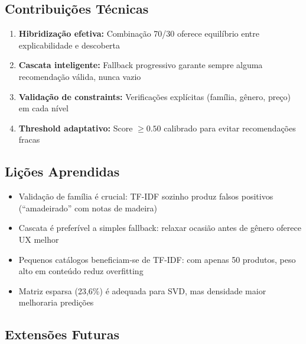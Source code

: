 \documentclass[12pt,a4paper]{article}
\begin{document}
\subsection{Contribuições Técnicas}

\begin{enumerate}
    \item \textbf{Hibridização efetiva:} Combinação 70/30 oferece equilíbrio entre explicabilidade e descoberta
    
    \item \textbf{Cascata inteligente:} Fallback progressivo garante sempre alguma recomendação válida, nunca vazio
    
    \item \textbf{Validação de constraints:} Verificações explícitas (família, gênero, preço) em cada nível
    
    \item \textbf{Threshold adaptativo:} Score $\geq 0.50$ calibrado para evitar recomendações fracas
\end{enumerate}

\subsection{Lições Aprendidas}

\begin{itemize}
    \item Validação de família é crucial: TF-IDF sozinho produz falsos positivos (``amadeirado'' com notas de madeira)
    
    \item Cascata é preferível a simples fallback: relaxar ocasião antes de gênero oferece UX melhor
    
    \item Pequenos catálogos beneficiam-se de TF-IDF: com apenas 50 produtos, peso alto em conteúdo reduz overfitting
    
    \item Matriz esparsa (23,6\%) é adequada para SVD, mas densidade maior melhoraria predições
\end{itemize}

\subsection{Extensões Futuras}
\end{document}
